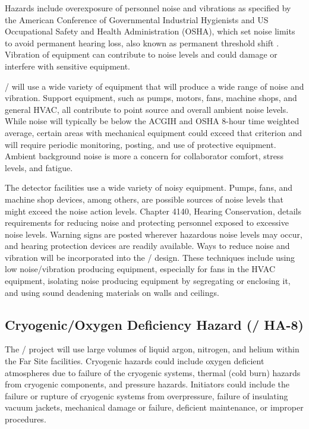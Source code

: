 Hazards include overexposure of personnel noise and vibrations as
specified by the American Conference of Governmental Industrial
Hygienists and US Occupational Safety and Health Administration
(OSHA), which set noise limits to avoid permanent hearing loss, also
known as permanent threshold shift . Vibration of equipment can
contribute to noise levels and could damage or interfere with
sensitive equipment.

/ will use a wide variety of equipment that
will produce a wide range of noise and vibration. Support equipment,
such as pumps, motors, fans, machine shops, and general HVAC, all
contribute to point source and overall ambient noise levels. While
noise will typically be below the ACGIH and OSHA 8-hour time weighted
average, certain areas with mechanical equipment could exceed that
criterion and will require periodic monitoring, posting, and use of
protective equipment. Ambient background noise is more a concern for
collaborator comfort, stress levels, and fatigue.

The detector facilities use a wide variety of noisy equipment. Pumps,
fans, and machine shop devices, among others, are possible sources of
noise levels that might exceed the \fnal noise action
levels.  Chapter 4140, Hearing Conservation, details
requirements for reducing noise and protecting personnel exposed to
excessive noise levels. Warning signs are posted wherever hazardous
noise levels may occur, and hearing protection devices are readily
available. Ways to reduce noise and vibration will be incorporated
into the / design. These techniques include
using low noise/vibration producing equipment, especially for fans in
the HVAC equipment, isolating noise producing equipment by segregating
or enclosing it, and using sound deadening materials on walls and
ceilings.

\subsection{Cryogenic/Oxygen Deficiency Hazard (/ HA-8)}

The / project will use large volumes of liquid
argon, nitrogen, and helium within the Far Site facilities. Cryogenic
hazards could include oxygen deficient atmospheres due to failure of
the cryogenic systems, thermal (cold burn) hazards from cryogenic
components, and pressure hazards. Initiators could include the failure
or rupture of cryogenic systems from overpressure, failure of
insulating vacuum jackets, mechanical damage or failure, deficient
maintenance, or improper procedures.

